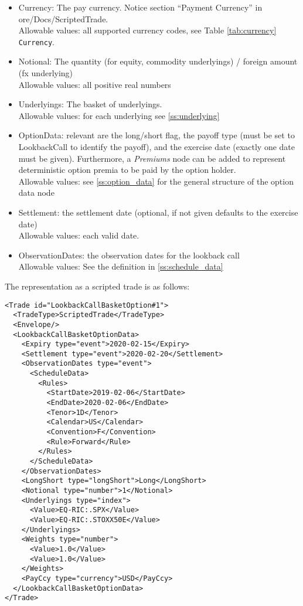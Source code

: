 \begin{itemize}
\item Currency: The pay currency. Notice section ``Payment Currency'' in ore/Docs/ScriptedTrade. \\
  Allowable values: all supported currency codes, see Table \ref{tab:currency} \lstinline!Currency!.
\item Notional: The quantity (for equity, commodity underlyings) / foreign amount (fx underlying) \\
  Allowable values: all positive real numbers
\item Underlyings: The basket of underlyings. \\
  Allowable values: for each underlying see \ref{ss:underlying}
\item OptionData: relevant are the long/short flag, the payoff type (must be set to LookbackCall to
  identify the payoff), and the exercise date (exactly one date must be given). Furthermore, a \emph{Premiums} node can be added to represent deterministic option premia to be paid by the option holder. \\
  Allowable values: see \ref{ss:option_data} for the general structure of the option data node
\item Settlement: the settlement date (optional, if not given defaults to the exercise date) \\
  Allowable values: each valid date.
\item ObservationDates: the observation dates for the lookback call \\
  Allowable values: See the definition in \ref{ss:schedule_data}
\end{itemize}

The representation as a scripted trade is as follows:

\begin{verbatim}
<Trade id="LookbackCallBasketOption#1">
  <TradeType>ScriptedTrade</TradeType>
  <Envelope/>
  <LookbackCallBasketOptionData>
    <Expiry type="event">2020-02-15</Expiry>
    <Settlement type="event">2020-02-20</Settlement>
    <ObservationDates type="event">
      <ScheduleData>
        <Rules>
          <StartDate>2019-02-06</StartDate>
          <EndDate>2020-02-06</EndDate>
          <Tenor>1D</Tenor>
          <Calendar>US</Calendar>
          <Convention>F</Convention>
          <Rule>Forward</Rule>
        </Rules>
      </ScheduleData>
    </ObservationDates>
    <LongShort type="longShort">Long</LongShort>
    <Notional type="number">1</Notional>
    <Underlyings type="index">
      <Value>EQ-RIC:.SPX</Value>
      <Value>EQ-RIC:.STOXX50E</Value>
    </Underlyings>
    <Weights type="number">
      <Value>1.0</Value>
      <Value>1.0</Value>
    </Weights>
    <PayCcy type="currency">USD</PayCcy>
  </LookbackCallBasketOptionData>
</Trade>
\end{verbatim}

